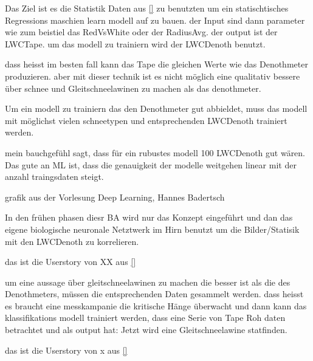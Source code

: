 Das Ziel ist es die Statistik Daten aus \ref{} zu benutzten um ein statischtisches Regressions maschien learn modell auf zu bauen. der Input sind dann parameter wie zum beistiel das RedVsWhite oder der RadiusAvg. der output ist der LWCTape. um das modell zu trainiern wird der LWCDenoth benutzt.

dass heisst im besten fall kann das Tape die gleichen Werte wie das Denothmeter produzieren. aber mit dieser technik ist es nicht möglich eine qualitativ bessere über schnee und Gleitschneelawinen zu machen als das denothmeter.

Um ein modell zu trainiern das den Denothmeter gut abbieldet, muss das modell mit möglichst vielen schneetypen und entsprechenden LWCDenoth trainiert werden.

mein bauchgefühl sagt, dass für ein rubustes modell 100 LWCDenoth gut wären. Das gute an ML ist, dass die genauigkeit der modelle weitgehen linear mit der  anzahl traingsdaten steigt.

\caption{grafik aus der Vorlesung Deep Learning, Hannes Badertsch}

In den frühen phasen diesr BA wird nur das Konzept eingeführt und dan das eigene biologische neuronale Netztwerk im Hirn benutzt um die Bilder/Statisik mit den LWCDenoth zu korrelieren.

das ist die Userstory von XX aus \ref{}


um eine aussage über gleitschneelawinen zu machen die besser ist als die des Denothmeters, müssen die entsprechenden Daten gesammelt werden. dass heisst es braucht eine messkampanie die  kritische Hänge überwacht und dann kann das klassifikations modell trainiert werden, dass eine Serie von Tape Roh daten betrachtet und als output hat: Jetzt wird eine Gleitschneelawine statfinden.

das ist die Userstory von x aus \ref{}
